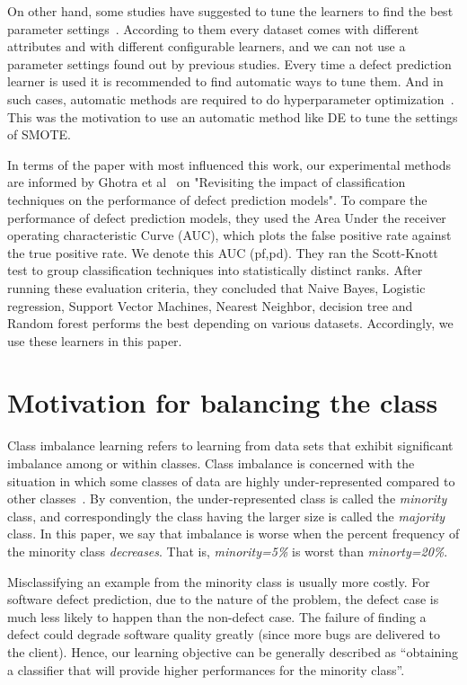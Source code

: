 \documentclass[sigconf]{acmart}
\theoremstyle{break}
\begin{document}
On other hand, some studies have suggested to tune the learners to find the best parameter settings~\cite{tantithamthavorn2016automated, fu2016tuning}. According to them every dataset comes with different attributes and with different configurable learners, and we can not use a parameter settings found out by previous studies. Every time a defect prediction learner is used it is recommended to find automatic ways to tune them. And in such cases, automatic methods are required to do hyperparameter optimization~\cite{agrawal2016wrong, fu2016tuning}. This was the motivation to use an automatic method like DE to tune the settings of SMOTE.

In terms of the paper with most influenced this work,
our experimental methods are informed 
by  Ghotra et al~\cite{ghotra2015revisiting} on "Revisiting the impact of classification techniques on the performance of defect prediction models". To  compare  the  performance  of  defect prediction  models,  they  used  the  Area  Under  the receiver operating characteristic Curve (AUC), which plots  the  false  positive  rate  against  the  true  positive rate. We denote this AUC (pf,pd). They ran the Scott-Knott test to group classification techniques into statistically distinct ranks. After running these evaluation criteria, they concluded that Naive Bayes, Logistic regression, Support Vector Machines, Nearest Neighbor, decision tree and Random forest performs the best depending on various datasets. Accordingly, we use these learners in this paper.

\section{Motivation for balancing the class}
\label{sect:motivation}

Class imbalance learning refers to learning from data sets that exhibit significant imbalance among or within classes. Class imbalance  is concerned with the situation in which some classes of data are
highly under-represented compared to other classes~\cite{he2009learning}. By convention,
the under-represented class is called the {\em minority} class,
and correspondingly the class having the larger size is called the
{\em majority} class. In this paper, we say that imbalance is worse when the percent frequency of
the minority class {\em decreases}. That is,
{\em minority=5\%} is worst than {\em minorty=20\%}.

Misclassifying an example from the minority class is usually more costly. For software defect prediction, due to the nature of the problem, the defect case is much less likely to happen than the non-defect case.  The failure of finding a defect could degrade software quality greatly (since more bugs
are delivered to the client). Hence,
our learning objective can be generally described
as ``obtaining a classifier that will provide higher performances for the minority class''.
\end{document}
